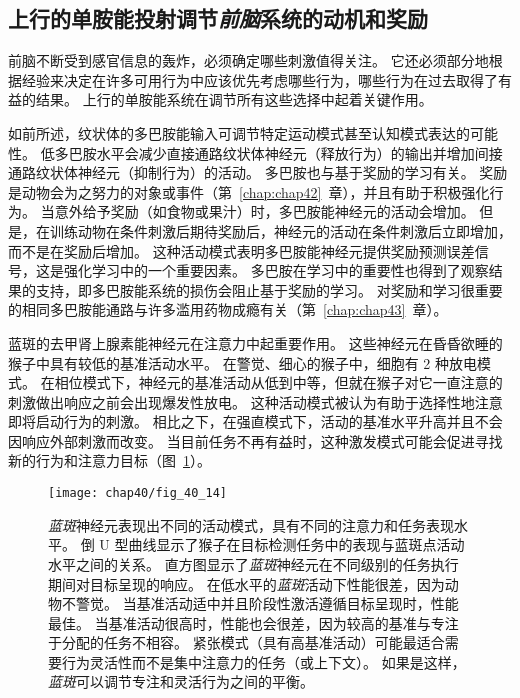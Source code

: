 \subsection{上行的单胺能投射调节\textit{前脑}系统的动机和奖励}

前脑不断受到感官信息的轰炸，必须确定哪些刺激值得关注。
它还必须部分地根据经验来决定在许多可用行为中应该优先考虑哪些行为，哪些行为在过去取得了有益的结果。
上行的单胺能系统在调节所有这些选择中起着关键作用。


如前所述，纹状体的多巴胺能输入可调节特定运动模式甚至认知模式表达的可能性。
低多巴胺水平会减少直接通路纹状体神经元（释放行为）的输出并增加间接通路纹状体神经元（抑制行为）的活动。
多巴胺也与基于奖励的学习有关。
奖励是动物会为之努力的对象或事件（第~\ref{chap:chap42}~章），并且有助于积极强化行为。
当意外给予奖励（如食物或果汁）时，多巴胺能神经元的活动会增加。
但是，在训练动物在条件刺激后期待奖励后，神经元的活动在条件刺激后立即增加，而不是在奖励后增加。
这种活动模式表明多巴胺能神经元提供奖励预测误差信号，这是强化学习中的一个重要因素。
多巴胺在学习中的重要性也得到了观察结果的支持，即多巴胺能系统的损伤会阻止基于奖励的学习。
对奖励和学习很重要的相同多巴胺能通路与许多滥用药物成瘾有关（第~\ref{chap:chap43}~章）。


蓝斑的去甲肾上腺素能神经元在注意力中起重要作用。
这些神经元在昏昏欲睡的猴子中具有较低的基准活动水平。
在警觉、细心的猴子中，细胞有 2 种放电模式。
在相位模式下，神经元的基准活动从低到中等，但就在猴子对它一直注意的刺激做出响应之前会出现爆发性放电。
这种活动模式被认为有助于选择性地注意即将启动行为的刺激。
相比之下，在强直模式下，活动的基准水平升高并且不会因响应外部刺激而改变。
当目前任务不再有益时，这种激发模式可能会促进寻找新的行为和注意力目标（图~\ref{fig:40_14}）。


\begin{figure}[htbp]
	\centering
	\texttt{[image: chap40/fig\_40\_14]}
	\caption{\textit{蓝斑}神经元表现出不同的活动模式，具有不同的注意力和任务表现水平。
		倒 U 型曲线显示了猴子在目标检测任务中的表现与蓝斑点活动水平之间的关系。
		直方图显示了\textit{蓝斑}神经元在不同级别的任务执行期间对目标呈现的响应。
		在低水平的\textit{蓝斑}活动下性能很差，因为动物不警觉。
		当基准活动适中并且阶段性激活遵循目标呈现时，性能最佳。
		当基准活动很高时，性能也会很差，因为较高的基准与专注于分配的任务不相容。
		紧张模式（具有高基准活动）可能最适合需要行为灵活性而不是集中注意力的任务（或上下文）。
		如果是这样，\textit{蓝斑}可以调节专注和灵活行为之间的平衡\cite{aston1999role}。}
	\label{fig:40_14}
\end{figure}


